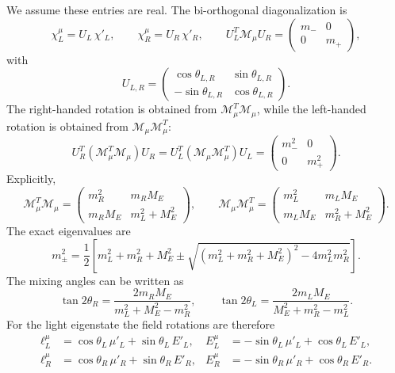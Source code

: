 \documentclass[onecolumn, aps, nofootinbib, prd, preprint, floats, floatfix, amsmath, amssymb, superscriptaddress, preprintnumbers]{revtex4-1}
\begin{document}
We assume these entries are real. The bi-orthogonal diagonalization is
\begin{equation}
\chi^\mu_L=U_L\,\chi'_L,\qquad
\chi^\mu_R=U_R\,\chi'_R,\qquad
U_L^T\mathcal{M}_\mu U_R =
\begin{pmatrix}
m_-&0\\
0&m_+
\end{pmatrix},
\end{equation}
with
\begin{equation}
U_{L,R}=
\begin{pmatrix}
\cos\theta_{L,R} & \sin\theta_{L,R}\\
-\sin\theta_{L,R} & \cos\theta_{L,R}
\end{pmatrix}.
\end{equation}
The right-handed rotation is obtained from $\mathcal{M}_\mu^T\mathcal{M}_\mu$, while the left-handed rotation is obtained from $\mathcal{M}_\mu\mathcal{M}_\mu^T$:
\begin{equation}
U_R^T(\mathcal{M}_\mu^T\mathcal{M}_\mu)U_R
=
U_L^T(\mathcal{M}_\mu\mathcal{M}_\mu^T)U_L
=
\begin{pmatrix}
m_-^2&0\\
0&m_+^2
\end{pmatrix}.
\end{equation}
Explicitly,
\begin{equation}
\mathcal{M}_\mu^T\mathcal{M}_\mu=
\begin{pmatrix}
m_R^2 & m_R M_E\\
m_R M_E & m_L^2+M_E^2
\end{pmatrix},
\qquad
\mathcal{M}_\mu\mathcal{M}_\mu^T=
\begin{pmatrix}
m_L^2 & m_L M_E\\
m_L M_E & m_R^2+M_E^2
\end{pmatrix}.
\end{equation}
The exact eigenvalues are
\begin{equation}
m_\pm^2=
\frac{1}{2}
\left[
m_L^2+m_R^2+M_E^2
\pm
\sqrt{(m_L^2+m_R^2+M_E^2)^2-4m_L^2m_R^2}
\right].
\label{eq:exact-masses-2by2}
\end{equation}
The mixing angles can be written as
\begin{equation}
\tan2\theta_R
=
\frac{2m_RM_E}{m_L^2+M_E^2-m_R^2},
\qquad
\tan2\theta_L
=
\frac{2m_LM_E}{M_E^2+m_R^2-m_L^2}.
\label{eq:mixing-angles-2by2}
\end{equation}
For the light eigenstate the field rotations are therefore
\begin{equation}
\begin{aligned}
\ell^\mu_L&=\cos\theta_L\,\mu'_L+\sin\theta_L\,E'_L,
&
E^\mu_L&=-\sin\theta_L\,\mu'_L+\cos\theta_L\,E'_L,\\
\ell^\mu_R&=\cos\theta_R\,\mu'_R+\sin\theta_R\,E'_R,
&
E^\mu_R&=-\sin\theta_R\,\mu'_R+\cos\theta_R\,E'_R .
\end{aligned}
\end{equation}
\end{document}
